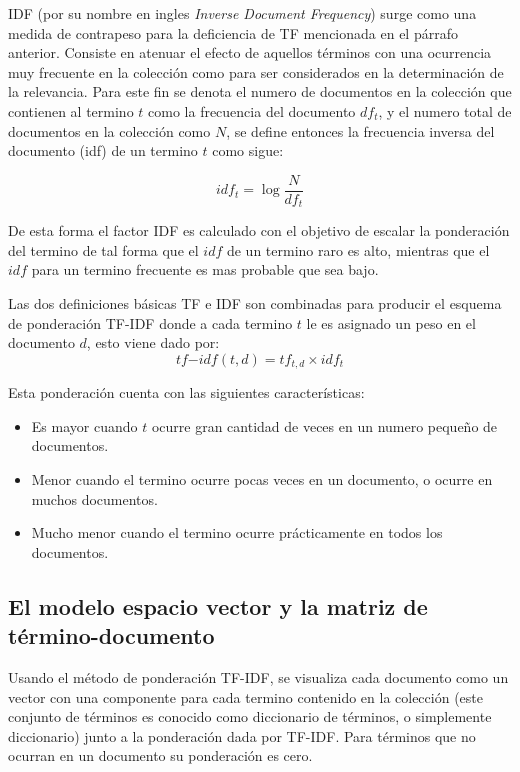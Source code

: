   IDF (por su nombre en ingles \textit{Inverse Document Frequency}) surge como una medida de contrapeso para la deficiencia de TF mencionada en el párrafo anterior. Consiste en atenuar el efecto de aquellos términos con una ocurrencia muy frecuente en la colección como para ser considerados en la determinación de la relevancia. Para este fin se denota el numero de documentos en la colección que contienen al termino $t$ como la frecuencia del documento $df_t$, y el numero total de documentos en la colección como $N$, se define entonces la frecuencia inversa del documento (idf) de un termino $t$ como sigue:
  
  \begin{equation} \label{eq:idf} 
idf_t=\log\frac{N}{df_t}
\end{equation}


  De esta forma el factor IDF es calculado con el objetivo de escalar la ponderación del termino de tal forma que el $idf$ de un termino raro es alto, mientras que el $idf$ para un termino frecuente es mas probable que sea bajo. 

  Las dos definiciones básicas TF e IDF son combinadas para producir el esquema de ponderación TF-IDF donde a cada termino $t$ le es asignado un peso en el documento $d$, esto viene dado por:
  \begin{equation} \label{eq:tfidf} 
tf\mathrm{-}idf(t,d)=tf_{t,d}\times idf_t
\end{equation}

  Esta ponderación cuenta con las siguientes características: 
  \begin{itemize}
    \item Es mayor cuando $t$ ocurre gran cantidad de veces en un numero pequeño de documentos.
    \item Menor cuando el termino ocurre pocas veces en un documento, o ocurre en muchos documentos.
    \item Mucho menor cuando el termino ocurre prácticamente en todos los documentos.
  \end{itemize}

\subsection{El modelo espacio vector y la matriz de término-documento}

  Usando el método de ponderación TF-IDF, se visualiza cada documento como un vector con una componente para cada termino contenido en la colección (este conjunto de términos es conocido como diccionario de términos, o simplemente diccionario)  junto a la ponderación dada por TF-IDF. Para términos que no ocurran en un documento su ponderación es cero.\cite{informationretrieval} 

